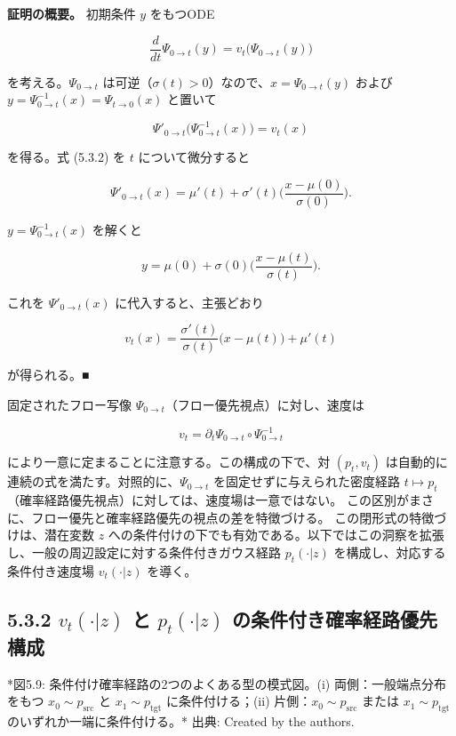 \textbf{証明の概要。} 初期条件 $y$ をもつODE

\[
\frac{d}{dt}\Psi_{0\to t}(y)=v_t\bigl(\Psi_{0\to t}(y)\bigr)
\]


を考える。$\Psi_{0\to t}$ は可逆（$\sigma(t)>0$）なので、$x=\Psi_{0\to t}(y)$ および $y=\Psi_{0\to t}^{-1}(x)=\Psi_{t\to 0}(x)$ と置いて

\[
\Psi'_{0\to t}\bigl(\Psi_{0\to t}^{-1}(x)\bigr)=v_t(x)
\]


を得る。式 (5.3.2) を $t$ について微分すると

\[
\Psi'_{0\to t}(x)=\mu'(t)+\sigma'(t)\Biggl(\frac{x-\mu(0)}{\sigma(0)}\Biggr).
\]


$y=\Psi_{0\to t}^{-1}(x)$ を解くと

\[
y=\mu(0)+\sigma(0)\Biggl(\frac{x-\mu(t)}{\sigma(t)}\Biggr).
\]


これを $\Psi'_{0\to t}(x)$ に代入すると、主張どおり

\[
v_t(x)=\frac{\sigma'(t)}{\sigma(t)}\bigl(x-\mu(t)\bigr)+\mu'(t)
\]


が得られる。■

固定されたフロー写像 $\Psi_{0\to t}$（フロー優先視点）に対し、速度は

\[
v_t=\partial_t\Psi_{0\to t}\circ\Psi_{0\to t}^{-1}
\]


により一意に定まることに注意する。この構成の下で、対 $(p_t,v_t)$ は自動的に連続の式を満たす。対照的に、$\Psi_{0\to t}$ を固定せずに与えられた密度経路 $t\mapsto p_t$（確率経路優先視点）に対しては、速度場は一意ではない。
この区別がまさに、フロー優先と確率経路優先の視点の差を特徴づける。
この閉形式の特徴づけは、潜在変数 $z$ への条件付けの下でも有効である。以下ではこの洞察を拡張し、一般の周辺設定に対する条件付きガウス経路 $p_t(\cdot|z)$ を構成し、対応する条件付き速度場 $v_t(\cdot|z)$ を導く。

\subsection*{5.3.2 $v_t(\cdot|z)$ と $p_t(\cdot|z)$ の条件付き確率経路優先構成}




*図5.9: 条件付け確率経路の2つのよくある型の模式図。(i) 両側：一般端点分布をもつ $x_0\sim p_{\mathrm{src}}$ と $x_1\sim p_{\mathrm{tgt}}$ に条件付ける；(ii) 片側：$x_0\sim p_{\mathrm{src}}$ または $x_1\sim p_{\mathrm{tgt}}$ のいずれか一端に条件付ける。*
出典: Created by the authors.

